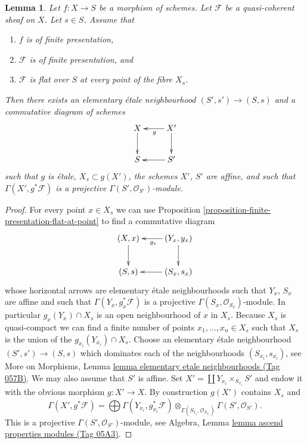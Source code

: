 \documentclass{amsart}
\theoremstyle{plain}
\newtheorem{lemma}[subsection]{Lemma}
\theoremstyle{definition}
\theoremstyle{remark}
\numberwithin{equation}{subsection}
\begin{document}
\begin{lemma}
\label{lemma-finite-presentation-flat-along-fibre}
Let $f : X \to S$ be a morphism of schemes.
Let $\mathcal{F}$ be a quasi-coherent sheaf on $X$.
Let $s \in S$.
Assume that
\begin{enumerate}
\item $f$ is of finite presentation,
\item $\mathcal{F}$ is of finite presentation, and
\item $\mathcal{F}$ is flat over $S$ at every point of the fibre $X_s$.
\end{enumerate}
Then there exists an elementary \'etale neighbourhood
$(S', s') \to (S, s)$ and a commutative diagram of schemes
$$
\xymatrix{
X \ar[d] & X' \ar[l]^g \ar[d] \\
S & S' \ar[l]
}
$$
such that $g$ is \'etale, $X_s \subset g(X')$, the schemes
$X'$, $S'$ are affine, and such that
$\Gamma(X', g^*\mathcal{F})$ is a projective
$\Gamma(S', \mathcal{O}_{S'})$-module.
\end{lemma}

\begin{proof}
For every point $x \in X_s$ we can use
Proposition \ref{proposition-finite-presentation-flat-at-point}
to find a commutative diagram
$$
\xymatrix{
(X, x) \ar[d] & (Y_x, y_x) \ar[l]^{g_x} \ar[d] \\
(S, s) & (S_x, s_x) \ar[l]
}
$$
whose horizontal arrows are elementary \'etale neighbourhoods
such that $Y_x$, $S_x$ are affine and such that
$\Gamma(Y_x, g_x^*\mathcal{F})$ is a projective
$\Gamma(S_x, \mathcal{O}_{S_x})$-module. In particular
$g_x(Y_x) \cap X_s$ is an open neighbourhood of $x$ in $X_s$.
Because $X_s$ is quasi-compact we can find a finite number of points
$x_1, \ldots, x_n \in X_s$ such that $X_s$ is the union of
the $g_{x_i}(Y_{x_i}) \cap X_s$. Choose an elementary \'etale neighbourhood
$(S' , s') \to (S, s)$ which dominates each of the neighbourhoods
$(S_{x_i}, s_{x_i})$, see
More on Morphisms,
Lemma \href{https://stacks.math.columbia.edu/tag/057B}{lemma elementary etale neighbourhoods (Tag 057B)}.
We may also assume that $S'$ is affine.
Set $X' = \coprod Y_{x_i} \times_{S_{x_i}} S'$ and endow it with the
obvious morphism $g : X' \to X$.
By construction $g(X')$ contains $X_s$ and
$$
\Gamma(X', g^*\mathcal{F})
=
\bigoplus \Gamma(Y_{x_i}, g_{x_i}^*\mathcal{F})
\otimes_{\Gamma(S_{x_i}, \mathcal{O}_{S_{x_i}})}
\Gamma(S', \mathcal{O}_{S'}).
$$
This is a projective $\Gamma(S', \mathcal{O}_{S'})$-module, see
Algebra, Lemma \href{https://stacks.math.columbia.edu/tag/05A3}{lemma ascend properties modules (Tag 05A3)}.
\end{proof}
\end{document}
